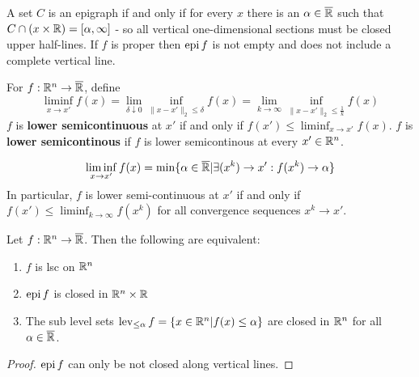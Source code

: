 \begin{thm}
  \label{sec:existence-4}
  A set $C$ is an epigraph if and only if for every $x$ there is an
  $\alpha \in \overline {\mathbb{R}}$ such that $C \cap (x \times \mathbb{R}) = [\alpha,
  \infty]$ - so all vertical one-dimensional sections must be closed
  upper half-lines. If $f$ is proper then $\operatorname*{epi} f $ is not empty and
  does not include a complete vertical line.
\end{thm}

\begin{defn}
  \label{sec:existence-5}
  For $f: \mathbb{R}^{n} \rightarrow \overline {\mathbb{R}}$, define
  \begin{equation}
    \label{eq:3}
    \liminf_{x \rightarrow x'} f(x) = \lim_{\delta \downarrow 0}
    \inf_{\| x - x'\|_{2} \leq \delta} f(x) = \lim_{k \rightarrow
      \infty} \inf_{\| x - x'\|_{2} \leq \frac{1}{k}} f(x)
  \end{equation}
  $f$ is \textbf{lower semicontinuous} at $x'$ if and only if $f(x')
  \leq \liminf_{x \rightarrow x'} f(x)$.
  $f$ is \textbf{lower semicontinous} if $f$ is lower semicontinous at
  every $x' \in \mathbb{R}^{n}$.
\end{defn}

\begin{thm}
  \label{sec:existence-7}
  \begin{equation}
    \label{eq:4}
    \liminf_{x \rightarrow x'} f(x) = \min \{ \alpha \in \overline {\mathbb{R}}
    | \exists (x^{k}) \rightarrow x' : f(x^{k}) \rightarrow \alpha \}
  \end{equation}
  In particular, $f$ is lower semi-continuous at $x'$ if and only if
  $f(x') \leq \liminf_{k \rightarrow \infty} f(x^{k})$ for all
  convergence sequences $x^{k} \rightarrow x'$.
\end{thm}

\begin{thm}
  \label{sec:existence-8}
  Let $f: \mathbb{R}^{n} \rightarrow \overline {\mathbb{R}}$.  Then the following are
  equivalent:
  \begin{enumerate}
  \item $f$ is lsc on $\mathbb{R}^{n}$
  \item $\operatorname*{epi} f$ is closed in $\mathbb{R}^{n} \times \mathbb{R}$
  \item The sub level sets $\operatorname*{lev}_{\leq \alpha} f = \{ x \in \mathbb{R}^{n} |
    f(x) \leq \alpha \} $ are closed in $\mathbb{R}^{n}$ for all $\alpha \in
    \overline {\mathbb{R}}$.
  \end{enumerate}
\end{thm}

\begin{proof}
  $\operatorname*{epi} f$ can only be not closed along vertical lines.
\end{proof}


